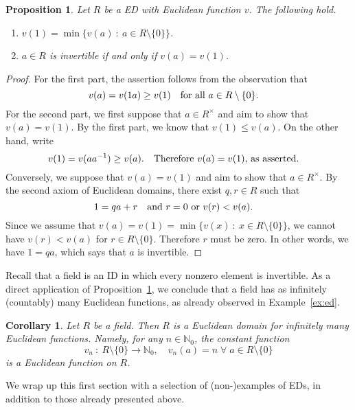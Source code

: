 \documentclass[12pt]{article}
\newcommand{\qbox}[1]{\quad\hbox{#1}\quad}
\newtheorem{cor}[thm]{Corollary}
\newtheorem{prop}[thm]{Proposition}
\theoremstyle{definition}
\newcounter{ex}\renewcommand\theex{\arabic{ex}}
\newcommand{\N}{\ensuremath{\mathbb{N}}}
\begin{document}
\begin{prop}\label{prop:ed-invert}
Let $R$ be a ED with Euclidean function $v$. The following hold.
\begin{enumerate}
\item $v(1)=\min\{v(a)~:~a\in R\setminus\{0\}\}$.
\item $a\in R$ is invertible if and only if $v(a)=v(1)$.
\end{enumerate}
\end{prop}

\begin{proof}
For the first part, the assertion follows from the observation that 
$$v(a)=v(1a)\geq v(1)\qbox{for all $a\in R\setminus\{0\}$.}$$
For the second part, we first suppose that $a\in R^\times$ and aim to
show that $v(a)=v(1)$.
By the first part, we know that $v(1)\leq v(a)$.
On the other hand, write
$$v(1)=v(aa^{-1})\geq v(a).\qbox{Therefore $v(a)=v(1)$, as
asserted.}$$
Conversely, we suppose that $v(a)=v(1)$ and aim to show that
$a\in R^\times$. 
By the second axiom of Euclidean domains, there exist $q,r\in R$ such
that
$$1=qa+r\qbox{and $r=0$ or $v(r)<v(a)$.}$$
Since we assume that $v(a)=v(1)=\min\{v(x)~:~x\in R\setminus\{0\}\}$,
we cannot have $v(r)<v(a)$ for $r\in R\setminus\{0\}$. Therefore $r$
must be zero. In other words, we have
$1=qa$, which says that $a$ is invertible.
\end{proof}

Recall that a field is an ID in which every nonzero element is
invertible. As a direct application of
Proposition~\ref{prop:ed-invert}, we conclude that a field has as
infinitely (countably) many Euclidean functions, as already observed
in Example~\ref{ex:ed}.

\begin{cor}\label{cor:ed-field}
Let $R$ be a field. Then $R$ is a Euclidean domain for infinitely many
Euclidean functions. Namely, for any $n\in\N_0$, the constant function
$$v_n~:~R\setminus\{0\}\longrightarrow\N_0,\quad
v_n(a)=n\;\forall\;a\in R\setminus\{0\}$$
is a Euclidean function on $R$.
\end{cor}

We wrap up this first section with a selection of
(non-)examples of EDs, in addition to those already presented above.
\end{document}
